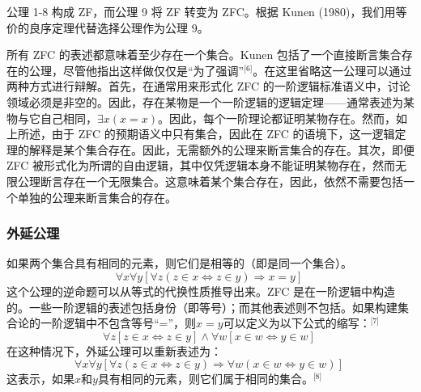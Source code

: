 公理 1-8 构成 ZF，而公理 9 将 ZF 转变为 ZFC。根据 Kunen (1980)，我们用等价的良序定理代替选择公理作为公理 9。

所有 ZFC 的表述都意味着至少存在一个集合。Kunen 包括了一个直接断言集合存在的公理，尽管他指出这样做仅仅是“为了强调”\(^\text{[6]}\)。在这里省略这一公理可以通过两种方式进行辩解。首先，在通常用来形式化 ZFC 的一阶逻辑标准语义中，讨论领域必须是非空的。因此，存在某物是一个一阶逻辑的逻辑定理——通常表述为某物与它自己相同，\(\exists x (x = x)\)。因此，每个一阶理论都证明某物存在。然而，如上所述，由于 ZFC 的预期语义中只有集合，因此在 ZFC 的语境下，这一逻辑定理的解释是某个集合存在。因此，无需额外的公理来断言集合的存在。其次，即便 ZFC 被形式化为所谓的自由逻辑，其中仅凭逻辑本身不能证明某物存在，然而无限公理断言存在一个无限集合。这意味着某个集合存在，因此，依然不需要包括一个单独的公理来断言集合的存在。
\subsubsection{外延公理}  
如果两个集合具有相同的元素，则它们是相等的（即是同一个集合）。
\[
\forall x \forall y \left[ \forall z \left( z \in x \Leftrightarrow z \in y \right) \Rightarrow x = y \right]~
\]
这个公理的逆命题可以从等式的代换性质推导出来。ZFC 是在一阶逻辑中构造的。一些一阶逻辑的表述包括身份（即等号）；而其他表述则不包括。如果构建集合论的一阶逻辑中不包含等号“=”，则\( x = y \)可以定义为以下公式的缩写：\(^\text{[7]}\)
\[
\forall z \left[ z \in x \Leftrightarrow z \in y \right] \land \forall w \left[ x \in w \Leftrightarrow y \in w \right]~
\]
在这种情况下，外延公理可以重新表述为：
\[
\forall x \forall y \left[ \forall z \left( z \in x \Leftrightarrow z \in y \right) \Rightarrow \forall w \left( x \in w \Leftrightarrow y \in w \right) \right]~
\]
这表示，如果\( x \)和\( y \)具有相同的元素，则它们属于相同的集合。\(^\text{[8]}\)
